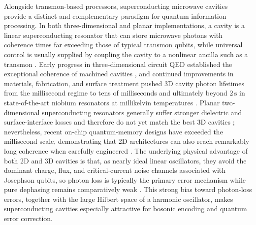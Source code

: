 Alongside transmon-based processors, superconducting microwave cavities provide a distinct and complementary paradigm for quantum information processing. In both three-dimensional and planar implementations, a cavity is a linear superconducting resonator that can store microwave photons with coherence times far exceeding those of typical transmon qubits, while universal control is usually supplied by coupling the cavity to a nonlinear ancilla such as a transmon \cite{Krasnok2024,Copetudo2024}. Early progress in three-dimensional circuit QED established the exceptional coherence of machined cavities \cite{Paik2011,Reagor2013}, and continued improvements in materials, fabrication, and surface treatment pushed 3D cavity photon lifetimes from the millisecond regime to tens of milliseconds and ultimately beyond \(2\,\mathrm{s}\) in state-of-the-art niobium resonators at millikelvin temperatures \cite{Reagor2016,Milul2023,Romanenko2020}. Planar two-dimensional superconducting resonators generally suffer stronger dielectric and surface-interface losses and therefore do not yet match the best 3D cavities \cite{Wang2009,Megrant2012}; nevertheless, recent on-chip quantum-memory designs have exceeded the millisecond scale, demonstrating that 2D architectures can also reach remarkably long coherence when carefully engineered \cite{Ganjam2024,Krayzman2024}. The underlying physical advantage of both 2D and 3D cavities is that, as nearly ideal linear oscillators, they avoid the dominant charge, flux, and critical-current noise channels associated with Josephson qubits, so photon loss is typically the primary error mechanism while pure dephasing remains comparatively weak \cite{Joshi2021,Cai2021}. This strong bias toward photon-loss errors, together with the large Hilbert space of a harmonic oscillator, makes superconducting cavities especially attractive for bosonic encoding and quantum error correction.

